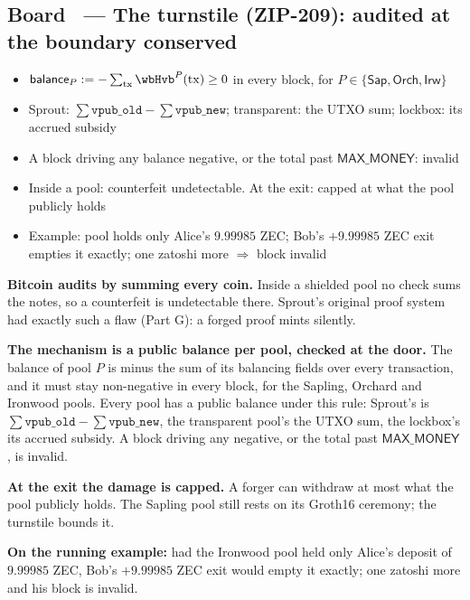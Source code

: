 \documentclass[11pt,a4paper]{article}
\makeatletter
\newcounter{board}
\newenvironment{board}[2]{\stepcounter{board}%
  \subsection*{Board \theboard\ --- #1 \hfill {\normalfont\small\color{arb}#2}}}{\medskip}
\newcommand{\Write}{\draw@head{Write}}
\newcommand{\Say}{\draw@head{Say}}
\makeatother
\begin{document}
\begin{board}{The turnstile (ZIP-209): audited at the boundary}{conserved}
\Write
\begin{itemize}
  \item $\mathsf{balance}_{P} := -\sum_{\mathrm{tx}}
    \wbHvb^{P}(\mathrm{tx}) \ge 0$ in every block, for
    $P \in \{\mathsf{Sap}, \mathsf{Orch}, \mathsf{Irw}\}$
  \item Sprout: $\sum \mathtt{vpub\_old} - \sum \mathtt{vpub\_new}$;
    transparent: the UTXO sum; lockbox: its accrued subsidy
  \item A block driving any balance negative, or the total past
    $\mathsf{MAX\_MONEY}$: invalid
  \item Inside a pool: counterfeit undetectable. At the exit: capped at
    what the pool publicly holds
  \item Example: pool holds only Alice's $9.99985$ ZEC; Bob's $+9.99985$
    ZEC exit empties it exactly; one zatoshi more $\Rightarrow$ block
    invalid
\end{itemize}
\Say
\textbf{Bitcoin audits by summing every coin.} Inside a shielded pool no
check sums the notes, so a counterfeit is undetectable there. Sprout's
original proof system had exactly such a flaw (Part G): a forged proof
mints silently.

\textbf{The mechanism is a public balance per pool, checked at the
door.} The balance of pool $P$ is minus the sum of its balancing fields
over every transaction, and it must stay non-negative in every block, for
the Sapling, Orchard and Ironwood pools. Every pool has a public balance
under this rule: Sprout's is $\sum \mathtt{vpub\_old} - \sum
\mathtt{vpub\_new}$, the transparent pool's the UTXO sum, the lockbox's
its accrued subsidy. A block driving any negative, or the total past
$\mathsf{MAX\_MONEY}$, is invalid.

\textbf{At the exit the damage is capped.} A forger can withdraw at most
what the pool publicly holds. The Sapling pool still rests on its Groth16
ceremony; the turnstile bounds it.

\textbf{On the running example:} had the Ironwood pool held only Alice's
deposit of $9.99985$ ZEC, Bob's $+9.99985$ ZEC exit would empty it
exactly; one zatoshi more and his block is invalid.


\end{board}
\end{document}
